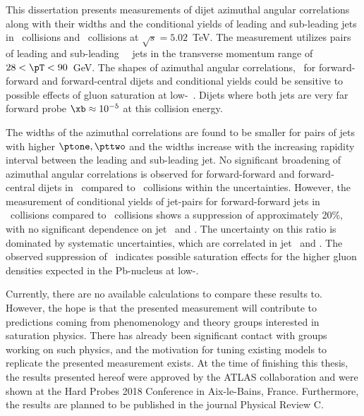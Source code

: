 
This dissertation presents measurements of dijet azimuthal angular correlations along with their widths and the conditional yields of leading and sub-leading jets in \pPb\ collisions and \pp\ collisions at $\sqrt{s}=5.02$~TeV. The measurement utilizes pairs of leading and sub-leading \RFour\ \antikt\ jets in the transverse momentum range of $28 < \pT < 90$~GeV. The shapes of azimuthal angular correlations, \conetwo\, for forward-forward and forward-central dijets and conditional yields could be sensitive to possible effects of gluon saturation at low-\xb~\cite{Kutak:2013yga,Kutak:2014wga}. Dijets where both jets are very far forward probe $\xb\approx10^{-5}$ at this collision energy.

The widths of the azimuthal correlations are found to be smaller for pairs of jets with higher $\ptone, \pttwo$ and the widths increase with the increasing rapidity interval between the leading and sub-leading jet. No significant broadening of azimuthal angular correlations is observed for forward-forward and forward-central dijets in \pPb\ compared to \pp\ collisions within the uncertainties.  However, the measurement of conditional yields of jet-pairs for forward-forward jets in \pPb\ collisions compared to \pp\ collisions shows a suppression of approximately 20\%, with no significant dependence on jet \pt\ and \ystar.   The uncertainty on this ratio is dominated by systematic uncertainties, which are correlated in jet \pt\ and \ystar. The observed suppression of \ippb\ indicates possible saturation effects for the higher gluon densities expected in the Pb-nucleus at low-\xb.

Currently, there are no available calculations to compare these results to. However, the hope is that the presented measurement will contribute to predictions coming from phenomenology and theory groups interested in saturation physics. There has already been significant contact with groups working on such physics, and the motivation for tuning existing models to replicate the presented measurement exists. At the time of finishing this thesis, the results presented hereof were approved by the ATLAS collaboration and were shown at the Hard Probes 2018 Conference in Aix-le-Bains, France. Furthermore, the results are planned to be published in the journal Physical Review C.
